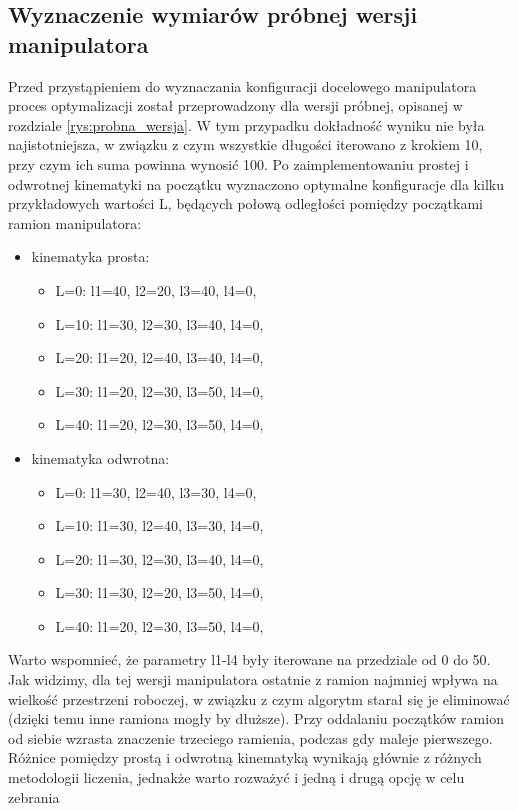 \documentclass[printmode]{mgr}
\begin{document}
\subsection{Wyznaczenie wymiarów próbnej wersji manipulatora}\label{sec:wymiary_probnej_wersji}
Przed przystąpieniem do wyznaczania konfiguracji docelowego manipulatora proces optymalizacji został przeprowadzony dla wersji próbnej,
opisanej w rozdziale \ref{rys:probna_wersja}. W tym przypadku dokładność wyniku nie była najistotniejsza, w związku z czym
wszystkie długości iterowano z krokiem 10, przy czym ich suma powinna wynosić 100. 
Po zaimplementowaniu prostej i odwrotnej kinematyki na początku wyznaczono optymalne
konfiguracje dla kilku przykładowych wartości L, będących połową odległości pomiędzy początkami ramion manipulatora:
\begin{itemize}
\item kinematyka prosta:
\begin{itemize}
\item L=0: l1=40, l2=20, l3=40, l4=0,
\item L=10: l1=30, l2=30, l3=40, l4=0,
\item L=20: l1=20, l2=40, l3=40, l4=0,
\item L=30: l1=20, l2=30, l3=50, l4=0,
\item L=40: l1=20, l2=30, l3=50, l4=0,
\end{itemize}
\item kinematyka odwrotna:
\begin{itemize}
\item L=0: l1=30, l2=40, l3=30, l4=0,
\item L=10: l1=30, l2=40, l3=30, l4=0,
\item L=20: l1=30, l2=30, l3=40, l4=0,
\item L=30: l1=30, l2=20, l3=50, l4=0,
\item L=40: l1=20, l2=30, l3=50, l4=0,
\end{itemize}
\end{itemize}
Warto wspomnieć, że parametry l1-l4 były iterowane na przedziale od 0 do 50. Jak widzimy, dla tej wersji manipulatora ostatnie z ramion
najmniej wpływa na wielkość przestrzeni roboczej, w związku z czym algorytm starał się je eliminować (dzięki temu inne ramiona mogły by dłuższe).
Przy oddalaniu początków ramion od siebie wzrasta znaczenie trzeciego ramienia, podczas gdy maleje pierwszego. Różnice pomiędzy prostą
i odwrotną kinematyką wynikają głównie z różnych metodologii liczenia, jednakże warto rozważyć i jedną i drugą opcję w celu zebrania
\end{document}
